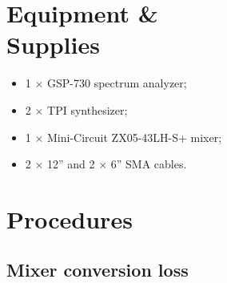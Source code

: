 \documentclass[letterpaper, 11pt]{article}
\begin{document}
\section{Equipment \& \\Supplies}

\begin{itemize}[itemsep=0.5ex]
	\item 1 $\times$ GSP-730 spectrum analyzer;
	\item 2 $\times$ TPI synthesizer;
	\item 1 $\times$ Mini-Circuit ZX05-43LH-S+ mixer;
	\item 2 $\times$ 12'' and 2 $\times$ 6'' SMA cables.
\end{itemize}

\section{Procedures}

\subsection{Mixer conversion loss}
\label{sec:mixer_cl}
\end{document}

